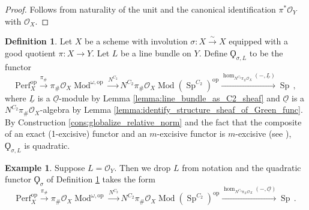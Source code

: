 \documentclass{article}
\DeclareMathOperator{\Mod}{Mod} %
\DeclareMathOperator{\Spectra}{Sp} %
\newcommand{\op}{\mathrm{op}} %
\newcommand{\perf}{\mathrm{Perf}}
\newtheorem{lemma}[equation]{Lemma}
\theoremstyle{definition}
\newtheorem{definition}[equation]{Definition}
\newtheorem{example}[equation]{Example}
\newcommand{\Lucy}[1]{\todo[color=cyan]{\linespread{1}\footnotesize L: #1}}
\begin{document}
\begin{proof}
    Follows from naturality of the unit and the canonical identification $ \pi^* \mathcal{O}_Y $ with $ \mathcal{O}_X $. 
\end{proof}
\begin{definition}\label{defn:quadratic_functor_from_good_quotient}
    Let $ X $ be a scheme with involution $ \sigma \colon X \xrightarrow{\sim} X $ equipped with a good quotient $ \pi \colon X \to Y $. 
    Let $ L $ be a line bundle on $ Y $. 
    Define $ \Qoppa_{\sigma, L} $ to be the functor
    \begin{equation*}
        \perf_X^\op \xrightarrow{\pi_{\#}} \pi_{\#}\mathcal{O}_X\Mod^{\omega,\op} \xrightarrow{N^{C_2}} N^{C_2}\pi_{\#}\mathcal{O}_X\Mod\left(\Spectra^{C_2}\right)^\op \xrightarrow{\hom_{N^{C_2}\pi_{\#}\mathcal{O}_X}(-,\underline{L})} \Spectra \,,
    \end{equation*}
    where $ \underline{L} $ is a $ \underline{\mathcal{O}} $-module by Lemma \ref{lemma:line_bundle_as_C2_sheaf} and $ \underline{\mathcal{O}} $ is a $ N^{C_2} \pi_{\#}\mathcal{O}_X $-algebra by Lemma \ref{lemma:identify_structure_sheaf_of_Green_func}. 
    By Construction \ref{cons:globalize_relative_norm} and the fact that the composite of an exact (1-excisive) functor and an $ m$-excisive functor is $m$-excisive (see \cite[\S2.2]{Kpoly}), $ \Qoppa_{\sigma,L} $ is quadratic. 
\end{definition}
\begin{example} 
    Suppose $ L = \mathcal{O}_Y $. 
    Then we drop $ L $ from notation and the quadratic functor $ \Qoppa_{\sigma} $ of Definition \ref{defn:quadratic_functor_from_good_quotient} takes the form
    \begin{equation*}
        \perf_X^\op \xrightarrow{\pi_{\#}} \pi_{\#}\mathcal{O}_X\Mod^{\omega,\op} \xrightarrow{N^{C_2}} N^{C_2}\pi_{\#}\mathcal{O}_X\Mod\left(\Spectra^{C_2}\right)^\op \xrightarrow{\hom_{N^{C_2}\pi_{\#}\mathcal{O}_X}(-,\underline{\mathcal{O}})} \Spectra \,.
    \end{equation*}    
\end{example}
\end{document}
